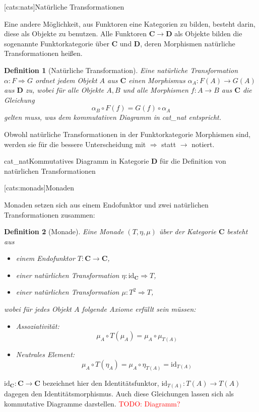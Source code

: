 \documentclass[12pt, a4paper, bibgerm]{scrbook}
\newcommand{\todo}[1]{
  \textcolor{red}{TODO: #1}
}
\newcommand\lsection{}
\newcommand\abb{}
\newcommand\fig{}
\newcommand\ato{\rightarrow} %
\newcommand\nto{\Rightarrow} %
\newtheorem{defini}{Definition}
\newcommand{\defi}[2]{%
  \begin{defini}[#1]
    \label{def:#1}
    #2
  \end{defini}
}
\begin{document}
\lsection[cats:nats]{Natürliche Transformationen}

Eine andere Möglichkeit, aus Funktoren eine Kategorien zu bilden,
besteht darin, diese als Objekte zu benutzen. Alle Funktoren $\mathbf{C}
\ato \mathbf{D}$ als Objekte bilden die sogenannte Funktorkategorie über
$\mathbf{C}$ und $\mathbf{D}$, deren Morphismen natürliche
Transformationen heißen.

\defi{Natürliche Transformation}{Eine natürliche Transformation $\alpha:F \nto
G$ ordnet jedem Objekt $A$ aus $\mathbf{C}$ einen Morphismus
$\alpha_A:F(A) \ato G(A)$ aus $\mathbf{D}$ zu, wobei für alle Objekte
$A,B$ und alle Morphismen $f:A \ato B$ aus $\mathbf{C}$ die
Gleichung
$$\alpha_B \circ F(f) = G(f) \circ \alpha_A $$
gelten muss, was dem kommutativen Diagramm in \abb{cat_nat}
entspricht.
}

Obwohl natürliche Transformationen in der Funktorkategorie Morphismen
sind, werden sie für die bessere Unterscheidung mit $\nto$ statt
$\ato$ notiert.

\fig{cat_nat}{Kommutatives Diagramm in Kategorie $\mathbf{D}$ für die Definition von
  natürlichen Transformationen}

\lsection[cats:monads]{Monaden}

Monaden setzen sich aus einem Endofunktor und zwei natürlichen
Transformationen zusammen:
\defi{Monade}{Eine Monade $(T,\eta,\mu)$ über der Kategorie $\mathbf{C}$ besteht aus
  \begin{itemize}
  \item einem Endofunktor $T:\mathbf{C} \ato \mathbf{C}$,
  \item einer natürlichen Transformation $\eta:\mathrm{id}_{\mathbf{C}} \nto T$,
  \item einer natürlichen Transformation $\mu:T^2 \nto T$,
  \end{itemize}
wobei für jedes Objekt $A$ folgende Axiome erfüllt sein müssen:
\begin{itemize}
\item Assoziativität: $$\mu_A \circ T(\mu_A) = \mu_A \circ \mu_{T(A)}$$
\item Neutrales Element: $$\mu_A \circ T(\eta_A) = \mu_A \circ \eta_{T(A)} = \mathrm{id}_{T(A)}$$
\end{itemize}
} $\mathrm{id}_\mathbf{C}:\mathbf{C} \ato \mathbf{C}$ bezeichnet hier
den Identitätsfunktor, $\mathrm{id}_{T(A)}:T(A) \ato T(A)$ dagegen den
Identitätsmorphismus. Auch diese Gleichungen lassen sich als kommutative
Diagramme darstellen. \todo{Diagramm?}
\end{document}

